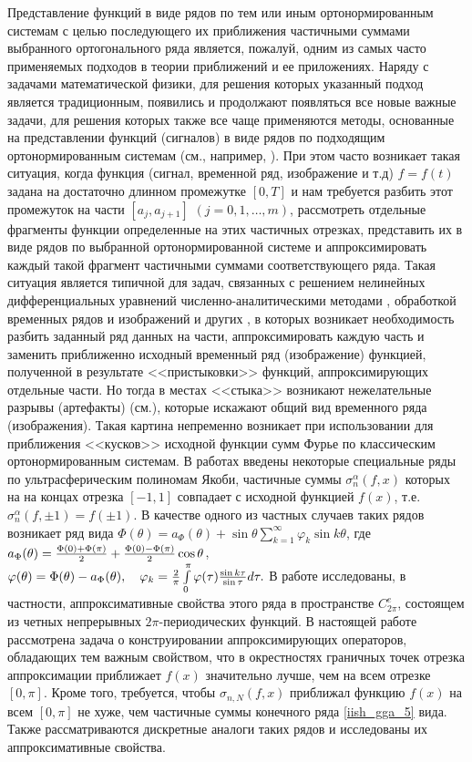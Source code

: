 Представление функций в виде рядов по тем или иным ортонормированным системам с целью последующего их приближения
частичными суммами выбранного ортогонального ряда является, пожалуй, одним из самых часто применяемых подходов в теории приближений и ее приложениях. Наряду с задачами математической физики, для решения которых указанный подход является традиционным, появились и продолжают появляться все новые важные задачи, для решения которых также все чаще применяются методы, основанные на представлении функций (сигналов) в виде рядов по подходящим ортонормированным системам (см., например, \cite{shii1, shii2, dedus3, pash4, arush5, tref6, tref7, muku8}). При этом часто возникает такая ситуация, когда функция (сигнал, временной ряд, изображение и т.д) $f=f(t)$ задана на достаточно длинном промежутке $[0,T]$ и нам требуется разбить этот промежуток на части $[a_j,a_{j+1}]$ $(j=0,1,\ldots,m)$, рассмотреть отдельные фрагменты функции определенные на этих частичных отрезках, представить их в виде рядов по выбранной ортонормированной системе и аппроксимировать каждый такой фрагмент частичными суммами соответствующего ряда. Такая ситуация является типичной для задач, связанных с решением нелинейных дифференциальных уравнений численно-аналитическими методами \cite{pash4, tref6}, обработкой временных рядов и изображений и других \cite{arush5, tref6, tref7}, в которых
возникает необходимость разбить заданный ряд данных на части,
аппроксимировать каждую часть и заменить приближенно исходный
временный ряд (изображение) функцией, полученной в результате
<<пристыковки>> функций, аппроксимирующих отдельные части. Но тогда в
местах <<стыка>> возникают нежелательные разрывы (артефакты) (см.\cite{muku8}), которые искажают общий вид временного ряда (изображения). Такая
картина непременно возникает при использовании для приближения
<<кусков>> исходной функции сумм Фурье по классическим
ортонормированным системам. В работах \cite{shii1, shii2} введены некоторые специальные ряды по ультрасферическим полиномам Якоби, частичные суммы $\sigma_n^\alpha(f,x)$ которых на на концах отрезка $[-1,1]$ совпадает с исходной функцией $f(x)$, т.е. $\sigma_n^\alpha(f,\pm1)=f(\pm1)$.
В качестве одного из частных случаев таких рядов возникает ряд вида $\Phi(\theta)=a_\Phi(\theta)+\sin\theta \sum_{k=1}^\infty\varphi_k\sin k \theta$,
где $a_\Phi(\theta)={\Phi(0)+\Phi(\pi)\over2}+{\Phi(0)-\Phi(\pi)\over2}\cos\theta$,
$\varphi(\theta)=\Phi(\theta)-a_\Phi(\theta),\quad \varphi_k={\frac2\pi}
\int\limits_{0}^\pi \varphi(\tau){\sin k\tau\over\sin\tau}d\tau.$
В работе \cite{shii2} исследованы, в частности, аппроксимативные свойства этого ряда в пространстве $C^e_{2\pi}$, состоящем из четных непрерывных $2\pi$-периодических функций.
В настоящей работе рассмотрена задача о конструировании аппроксимирующих операторов, обладающих тем важным свойством, что в окрестностях граничных точек отрезка аппроксимации приближает $f(x)$ значительно лучше, чем на всем отрезке $[0,\pi]$. Кроме того, требуется, чтобы $\sigma_{n,N}(f,x)$ приближал функцию $f(x)$ на всем $[0,\pi]$ не хуже, чем частичные суммы конечного ряда \eqref{iish_gga_5} вида. Также рассматриваются дискретные аналоги таких рядов и исследованы их аппроксимативные свойства.

